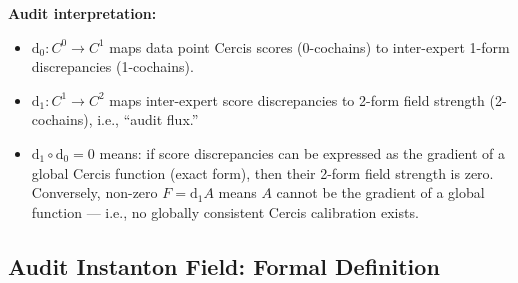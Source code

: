 \documentclass[12pt,a4paper]{article}
\theoremstyle{plain}
\theoremstyle{definition}
\theoremstyle{remark}
\newcommand{\dd}{\mathrm{d}}
\begin{document}
\textbf{Audit interpretation:}
\begin{itemize}
    \item $\dd_0: C^0 \to C^1$ maps data point Cercis scores (0-cochains) to inter-expert 1-form discrepancies (1-cochains).
    \item $\dd_1: C^1 \to C^2$ maps inter-expert score discrepancies to 2-form field strength (2-cochains), i.e., ``audit flux.''
    \item $\dd_1 \circ \dd_0 = 0$ means: if score discrepancies can be expressed as the gradient of a global Cercis function (exact form), then their 2-form field strength is zero. Conversely, non-zero $F = \dd_1 A$ means $A$ cannot be the gradient of a global function --- i.e., no globally consistent Cercis calibration exists.
\end{itemize}

\subsection{Audit Instanton Field: Formal Definition}
\label{sec:instanton_def}
\end{document}

